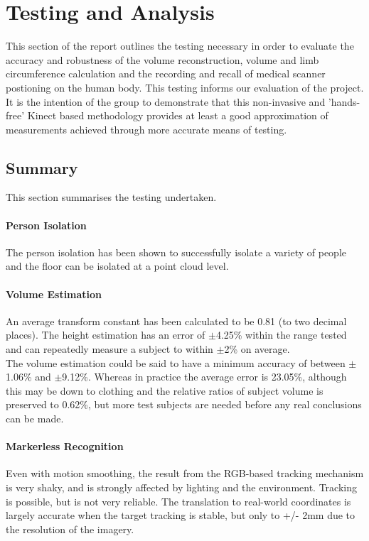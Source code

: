 \chapter{Testing and Analysis}
\label{testing}

This section of the report outlines the testing necessary in order to evaluate the accuracy and robustness of the volume reconstruction, volume and limb circumference calculation and the recording and recall of medical scanner postioning on the human body. This testing informs our evaluation of the project. It is the intention of the group to demonstrate that this non-invasive and 'hands-free' Kinect based methodology provides at least a good approximation of measurements achieved through more accurate means of testing. 








\newpage
\section{Summary}
This section summarises the testing undertaken.\\

\subsubsection{Person Isolation}
The person isolation has been shown to successfully isolate a variety of people and the floor can be isolated at a point cloud level.\\

\subsubsection{Volume Estimation}
An average transform constant has been calculated to be 0.81 (to two decimal places). The height estimation has an error of $\pm$4.25\% within the range tested and can repeatedly measure a subject to within $\pm$2\% on average.\\

The volume estimation could be said to have a minimum accuracy of between $\pm$1.06\% and $\pm$9.12\%. Whereas in practice the average error is 23.05\%, although this may be down to clothing and the relative ratios of subject volume is preserved to 0.62\%, but more test subjects are needed before any real conclusions can be made.\\

\subsubsection{Markerless Recognition}
Even with motion smoothing, the result from the RGB-based tracking mechanism is very shaky, and is strongly affected by lighting and the environment. Tracking is possible, but is not very reliable. The translation to real-world coordinates is largely accurate when the target tracking is stable, but only to +/- 2mm due to the resolution of the imagery.\\